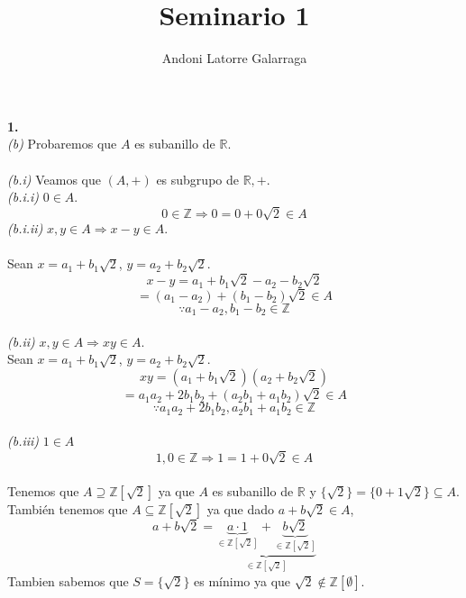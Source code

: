 \documentclass{article}
\title{Seminario 1}
\author{Andoni Latorre Galarraga}
\date{}
\newcommand{\R}{\mathbb{R}}
\begin{document}
\maketitle

\begin{multicols}{2}


\noindent
\textbf{1.}\\


\textit{(b)} Probaremos que $A$ es subanillo de $\R$.\\\\
\indent \textit{(b.i)} Veamos que $(A,+)$ es subgrupo de $\R,+$.\\
\indent \indent \textit{(b.i.i)} $0\in A$.
$$
0\in \mathbb{Z} \Rightarrow 0 = 0 + 0 \sqrt{2} \in A
$$
\indent \indent \textit{(b.i.ii)} $x,y\in A \Rightarrow x-y \in A$.\\\\
\indent \indent \indent Sean $x = a_1 + b_1 \sqrt{2}$, $y = a_2 + b_2 \sqrt{2}$.
$$
x-y = a_1 + b_1 \sqrt{2} - a_2 - b_2 \sqrt{2}
$$
$$
= (a_1-a_2) + (b_1-b_2) \sqrt{2} \in A
$$
$$
\because a_1-a_2 , b_1 - b_2 \in \mathbb{Z}
$$\\
\indent \textit{(b.ii)} $x,y\in A  \Rightarrow xy \in A$.\\
\indent \indent \indent Sean $x = a_1 + b_1 \sqrt{2}$, $y = a_2 + b_2 \sqrt{2}$.
$$
xy= (a_1 + b_1 \sqrt{2})(a_2 + b_2 \sqrt{2})
$$
$$
= a_1a_2+2b_1b_2 + (a_2b_1+a_1b_2) \sqrt{2} \in A
$$
$$
\because a_1a_2+2b_1b_2, a_2b_1+a_1b_2 \in \mathbb{Z}
$$\\
\indent \textit{(b.iii)} $1 \in A$
$$
1,0 \in \mathbb{Z} \Rightarrow 1=1+0\sqrt{2} \in A
$$\\
Tenemos que $A\supseteq \mathbb{Z}[\sqrt{2}]$ ya que $A$ es subanillo de $\R$ y $\{\sqrt{2}\} = \{0+1\sqrt{2}\} \subseteq A$. También tenemos que $A\subseteq \mathbb{Z}[\sqrt{2}]$ ya que dado $a+b\sqrt{2}\in A$,
$$
a+b\sqrt{2} = \underbrace{\underbrace{a\cdot 1}_{\in \mathbb{Z}[\sqrt{2}]} + \underbrace{b \sqrt{2}}_{\in \mathbb{Z}[\sqrt{2}]}}_{\in \mathbb{Z}[\sqrt{2}]}
$$
Tambien sabemos que $S = \{\sqrt{2}\}$ es mínimo ya que $\sqrt{2}\notin \mathbb{Z}[\emptyset]$.



\end{multicols}
\end{document}
